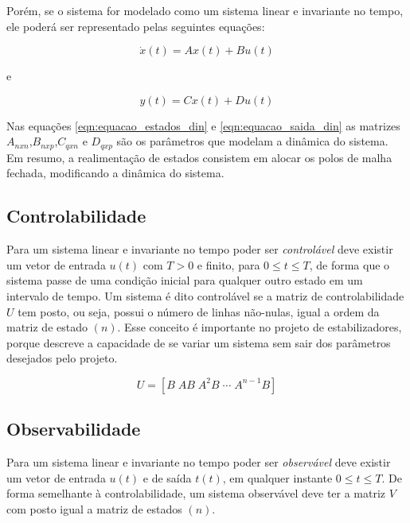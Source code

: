 \documentclass[
	12pt,				%
	openany,			%
	oneside,			%
	a4paper,			%
	english,			%
	french,				%
	spanish,			%
	brazil,				%
	]{abntex2}
\begin{document}
{Porém, se o sistema for modelado como um sistema linear e invariante no tempo, ele poderá ser representado pelas seguintes equações:

\begin{equation}
	\dot{x}(t) = Ax(t) + Bu(t)
	\label{eqn:equacao_estados_din}
\end{equation}

e

\begin{equation}
	y(t) = Cx(t) + Du(t)
	\label{eqn:equacao_saida_din}
\end{equation}

Nas equações \ref{eqn:equacao_estados_din} e \ref{eqn:equacao_saida_din} as matrizes $A_{nxn}$,$B_{nxp}$,$C_{qxn}$ e $D_{qxp}$ são os parâmetros que modelam a dinâmica do sistema. Em resumo, a realimentação de estados consistem em alocar os polos de malha fechada, modificando a dinâmica do sistema.

\subsection{Controlabilidade}

Para um sistema linear e invariante no tempo poder ser \textit{controlável} deve existir um vetor de entrada $u(t)$ com $T>0$ e finito, para $0 \leq t \leq T$, de forma que o sistema passe de uma condição inicial para qualquer outro estado em um intervalo de tempo. Um sistema é dito controlável se a matriz de controlabilidade $U$ tem posto, ou seja, possui o número de linhas não-nulas, igual a ordem da matriz de estado $(n)$. Esse conceito é importante no projeto de estabilizadores, porque descreve a capacidade de se variar um sistema sem sair dos parâmetros desejados pelo projeto.

\begin{equation}
	U = \left[B \; AB \; A^2B \; \cdots \; A^{n-1}B \right]
\end{equation}

\subsection{Observabilidade}

Para um sistema linear e invariante no tempo poder ser \textit{observável} deve existir um vetor de entrada $u(t)$ e de saída $t(t)$, em qualquer instante $0 \leq t \leq T$. De forma semelhante à controlabilidade, um sistema observável deve ter a matriz $V$ com posto igual a matriz de estados $(n)$.


}
\end{document}
